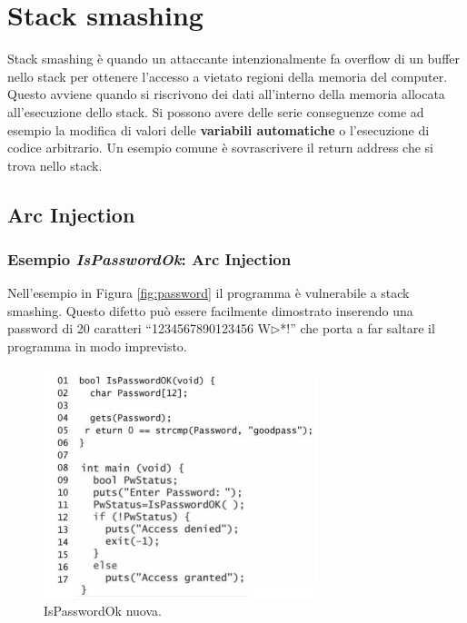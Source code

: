 \section{Stack smashing}
Stack smashing è quando un attaccante intenzionalmente fa overflow di un buffer nello stack per ottenere l'accesso a vietato regioni della memoria del computer. Questo avviene quando si riscrivono dei dati all'interno della memoria allocata all'esecuzione dello stack. Si possono avere delle serie conseguenze come ad esempio la modifica di valori delle \textbf{variabili automatiche} o l'esecuzione di codice arbitrario. Un esempio comune è sovrascrivere il return address che si trova nello stack.

\subsection{Arc Injection}
\subsubsection{Esempio \textit{IsPasswordOk}: Arc Injection} Nell'esempio in Figura \ref{fig:password} il programma è vulnerabile a stack smashing. Questo difetto può essere facilmente dimostrato inserendo una password di 20 caratteri  “1234567890123456 W$\triangleright$*!” che porta a far saltare il programma in modo imprevisto.
\begin{figure}[H]
    \centering
    \includegraphics[width=8cm, keepaspectratio]{capitoli/secure_coding/img/cap_2/pass_ok_new.png}
    \caption{IsPasswordOk nuova.}\label{fig:pass_ok_new}
\end{figure}

